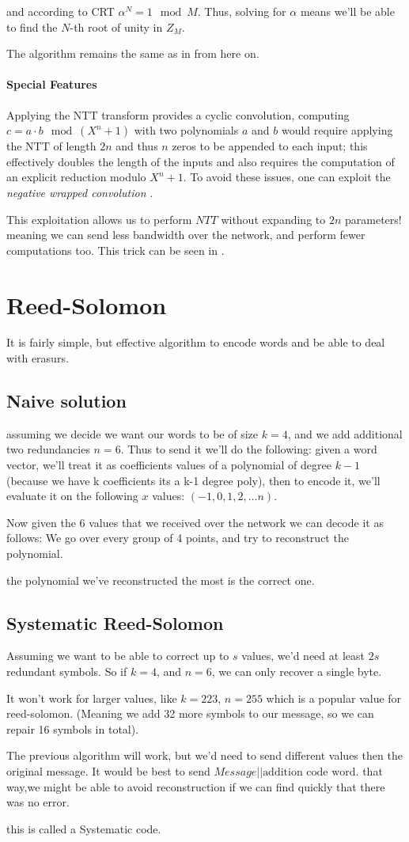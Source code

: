 and according to CRT $\alpha^N=1 \mod M$. Thus, solving for $\alpha$ 
means we'll be able to find the $N$-th root of unity in $Z_M$.

The algorithm remains the same as in  from here on.

\paragraph{Special Features}
Applying the NTT transform provides a cyclic convolution, computing 
$c = a \cdot b \mod (X^n + 1)$  with two polynomials $a$ and $b$ would require 
applying the NTT of length $2n$ and thus $n$ zeros to be appended to each input;
this effectively doubles the length of the inputs and also requires the computation of 
an explicit reduction modulo $X^n +1$. 
To avoid these issues, one can exploit the \emph{negative wrapped convolution} \cite{negantt}.

This exploitation allows us to perform $NTT$ without expanding to $2n$ parameters!
meaning we can send less bandwidth over the network, and perform fewer computations too. 
This trick can be seen in \cite{SEAL}.

\section{Reed-Solomon}
It is fairly simple, but effective algorithm to encode words and be able to deal with erasurs.
\subsection{Naive solution}
assuming we decide we want our words to be of size $k=4$, and we add additional two redundancies $n=6$. 
Thus to send it we'll do the following: given a word vector, we'll treat it as coefficients values of a 
polynomial of degree $k-1$ (because we have k coefficients its a k-1 degree poly), then to encode it, we'll evaluate it on the following $x$ values: $(-1,0,1,2,\dots n)$.


Now given the 6 values that we received over the network we can decode it as follows: 
We go over every group of 4 points, and try to reconstruct the polynomial. 

the polynomial we've reconstructed the most is the correct one.

\subsection{Systematic Reed-Solomon}
Assuming we want to be able to correct up to $s$ values, we'd need at least $2s$ redundant symbols.
So if $k=4$, and $n=6$, we can only recover a single byte.

It won't work for larger values, like $k=223$, $n=255$ which is a popular value for reed-solomon.
(Meaning we add 32 more symbols to our message, so we can repair 16 symbols in total).

The previous algorithm will work, but we'd need to send different values then 
the original message. It would be best to send $Message||\text{addition code word}$.
that way,we might be able to avoid reconstruction if we can find quickly that there was no error.

this is called a Systematic code. 
